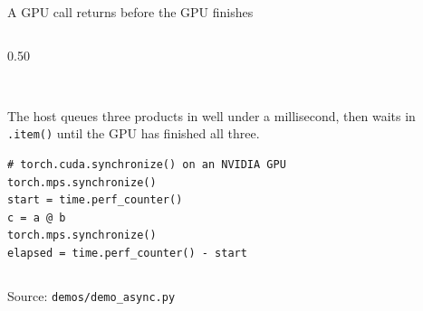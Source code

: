 \documentclass[aspectratio=169,10pt]{beamer}
\newcommand{\source}[1]{\par\vfill{\scriptsize\textcolor{inkGray}{Source: #1}\par}}
\newcommand{\figcaption}[1]{{\scriptsize\textcolor{inkGray}{#1}\par}}
\begin{document}
\begin{frame}[fragile]{A GPU call returns before the GPU finishes}
\begin{columns}[T]
\begin{column}{0.50\textwidth}
\\[4pt]
      \figcaption{The host queues three products in well under a millisecond,
      then waits in \texttt{.item()} until the GPU has finished all three.}\vspace{4pt}
      \begin{lstlisting}
# torch.cuda.synchronize() on an NVIDIA GPU
torch.mps.synchronize()
start = time.perf_counter()
c = a @ b
torch.mps.synchronize()
elapsed = time.perf_counter() - start
      \end{lstlisting}
    \end{column}
  \end{columns}
  \source{\texttt{demos/demo\_async.py}}
\end{frame}
\end{document}

